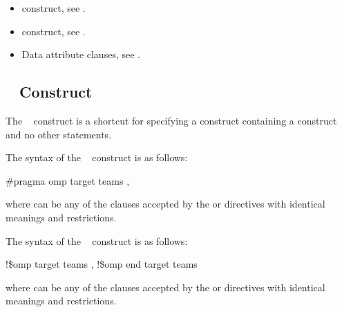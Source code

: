 {{{{\crossreferences
\begin{itemize}
\item {} construct, see 
.

\item {} construct, see 
.

\item Data attribute clauses, see 
.
\end{itemize}









\subsection{~ Construct}
\label{subsec:target teams Construct}
\summary
The ~ construct is a shortcut for specifying a  construct 
containing a  construct and no other statements.

\syntax
\ccppspecificstart
The syntax of the ~ construct is as follows:

\begin{boxedcode}
\#pragma omp target teams \plc{[clause[ [},\plc{] clause] ... ] new-line}
\end{boxedcode}

where  can be any of the clauses accepted by the  or  directives 
with identical meanings and restrictions.
\ccppspecificend

\fortranspecificstart
The syntax of the ~ construct is as follows:

\begin{boxedcode}
!\$omp target teams \plc{[clause[ [},\plc{] clause] ... ]}
!\$omp end target teams
\end{boxedcode}

where  can be any of the clauses accepted by the  or  directives 
with identical meanings and restrictions.
\fortranspecificend

\descr

}}}}
